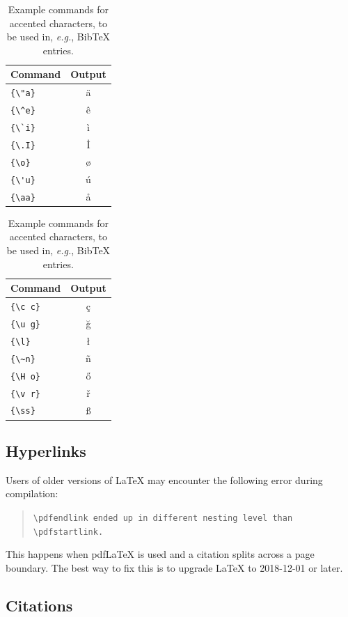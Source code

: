 \documentclass[11pt]{article}
\begin{document}
\begin{table}
\centering
\begin{tabular}{lc}
\hline
\textbf{Command} & \textbf{Output}\\
\hline
\verb|{\"a}| & {\"a} \\
\verb|{\^e}| & {\^e} \\
\verb|{\`i}| & {\`i} \\ 
\verb|{\.I}| & {\.I} \\ 
\verb|{\o}| & {\o} \\
\verb|{\'u}| & {\'u}  \\ 
\verb|{\aa}| & {\aa}  \\\hline
\end{tabular}
\begin{tabular}{lc}
\hline
\textbf{Command} & \textbf{Output}\\
\hline
\verb|{\c c}| & {\c c} \\ 
\verb|{\u g}| & {\u g} \\ 
\verb|{\l}| & {\l} \\ 
\verb|{\~n}| & {\~n} \\ 
\verb|{\H o}| & {\H o} \\ 
\verb|{\v r}| & {\v r} \\ 
\verb|{\ss}| & {\ss} \\
\hline
\end{tabular}
\caption{Example commands for accented characters, to be used in, \emph{e.g.}, Bib\TeX{} entries.}
\label{tab:accents}
\end{table}

\subsection{Hyperlinks}

Users of older versions of \LaTeX{} may encounter the following error during compilation: 
\begin{quote}
\tt\verb|\pdfendlink| ended up in different nesting level than \verb|\pdfstartlink|.
\end{quote}
This happens when pdf\LaTeX{} is used and a citation splits across a page boundary. The best way to fix this is to upgrade \LaTeX{} to 2018-12-01 or later.

\subsection{Citations}
\end{document}
